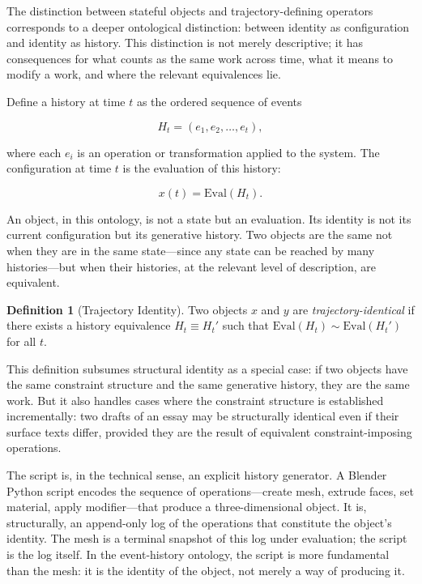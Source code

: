 \documentclass[12pt, twoside]{article}
\theoremstyle{plain}
\theoremstyle{definition}
\newtheorem{definition}[theorem]{Definition}
\theoremstyle{remark}
\begin{document}
The distinction between stateful objects and trajectory-defining operators corresponds to a deeper ontological distinction: between identity as configuration and identity as history. This distinction is not merely descriptive; it has consequences for what counts as the same work across time, what it means to modify a work, and where the relevant equivalences lie.

Define a history at time $t$ as the ordered sequence of events

\[
H_t = (e_1, e_2, \dots, e_t),
\]

where each $e_i$ is an operation or transformation applied to the system. The configuration at time $t$ is the evaluation of this history:

\[
x(t) = \text{Eval}(H_t).
\]

An object, in this ontology, is not a state but an evaluation. Its identity is not its current configuration but its generative history. Two objects are the same not when they are in the same state---since any state can be reached by many histories---but when their histories, at the relevant level of description, are equivalent.

\begin{definition}[Trajectory Identity]
Two objects $x$ and $y$ are \emph{trajectory-identical} if there exists a history equivalence $H_t \equiv H_t'$ such that $\text{Eval}(H_t) \sim \text{Eval}(H_t')$ for all $t$.
\end{definition}

This definition subsumes structural identity as a special case: if two objects have the same constraint structure and the same generative history, they are the same work. But it also handles cases where the constraint structure is established incrementally: two drafts of an essay may be structurally identical even if their surface texts differ, provided they are the result of equivalent constraint-imposing operations.

The script is, in the technical sense, an explicit history generator. A Blender Python script encodes the sequence of operations---create mesh, extrude faces, set material, apply modifier---that produce a three-dimensional object. It is, structurally, an append-only log of the operations that constitute the object's identity. The mesh is a terminal snapshot of this log under evaluation; the script is the log itself. In the event-history ontology, the script is more fundamental than the mesh: it is the identity of the object, not merely a way of producing it.
\end{document}
